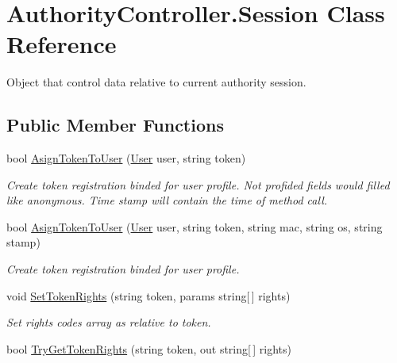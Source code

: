 \hypertarget{class_authority_controller_1_1_session}{}\section{Authority\+Controller.\+Session Class Reference}
\label{class_authority_controller_1_1_session}


Object that control data relative to current authority session.  


\subsection*{Public Member Functions}
\begin{DoxyCompactItemize}
\item 
bool \mbox{\hyperlink{class_authority_controller_1_1_session_a798dbdfeeb3ce9156d99d8b7962d9528}{Asign\+Token\+To\+User}} (\mbox{\hyperlink{class_authority_controller_1_1_data_1_1_user}{User}} user, string token)
\begin{DoxyCompactList}\small\item\em Create token registration binded for user profile. Not profided fields would filled like anonymous. Time stamp will contain the time of method call. \end{DoxyCompactList}\item 
bool \mbox{\hyperlink{class_authority_controller_1_1_session_ab164831d0a5fc909c200feba1ac882e4}{Asign\+Token\+To\+User}} (\mbox{\hyperlink{class_authority_controller_1_1_data_1_1_user}{User}} user, string token, string mac, string os, string stamp)
\begin{DoxyCompactList}\small\item\em Create token registration binded for user profile. \end{DoxyCompactList}\item 
void \mbox{\hyperlink{class_authority_controller_1_1_session_a481d888a9a2e90f1e43c60de7e1c7a71}{Set\+Token\+Rights}} (string token, params string\mbox{[}$\,$\mbox{]} rights)
\begin{DoxyCompactList}\small\item\em Set rights\textquotesingle{} codes array as relative to token. \end{DoxyCompactList}\item 
bool \mbox{\hyperlink{class_authority_controller_1_1_session_a37157e74e3aee082b7adfb906ec69511}{Try\+Get\+Token\+Rights}} (string token, out string\mbox{[}$\,$\mbox{]} rights)

\end{DoxyCompactItemize}
